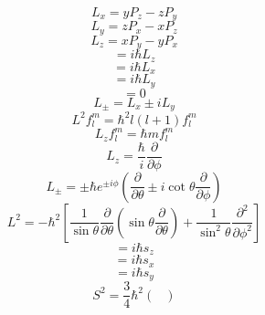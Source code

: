 \documentclass[10pt]{article}
\begin{document}
\begin{multicols}{3}
\begin{equation*}
L_{x}=yP_z-zP_y
\end{equation*}
\begin{equation*}
L_{y}=zP_x-xP_z
\end{equation*}
\begin{equation*}
L_{z}=xP_y-yP_x
\end{equation*}
\begin{equation*}
[L_x,L_y]=i\hbar L_z
\end{equation*}
\begin{equation*}
[L_y,L_z]=i\hbar L_x
\end{equation*}
\begin{equation*}
[L_z,L_x]=i\hbar L_y
\end{equation*}
\begin{equation*}
[L^2,L]=0
\end{equation*}
\begin{equation*}
L_{\pm}=L_x\pm iL_y
\end{equation*}
\begin{equation*}
L^{2}f_{l}^{m}=\hbar^2l(l+1)f_{l}^{m}
\end{equation*}
\begin{equation*}
L_zf_{l}^{m}=\hbar m f_{l}^{m}
\end{equation*}
\begin{equation*}
L_z=\frac{\hbar}{i}\frac{\partial}{\partial \phi}
\end{equation*}
\begin{equation*}
L_{\pm}=\pm\hbar e^{\pm i \phi}\left(\frac{\partial}{\partial \theta} \pm i\cot{\theta}\frac{\partial}{\partial \phi}\right)
\end{equation*}
\begin{equation*}
L^2=-\hbar^2\left[\frac{1}{\sin{\theta}}\frac{\partial}{\partial \theta}\left(\sin{\theta}\frac{\partial}{\partial \theta}\right)+\frac{1}{\sin^2{\theta}}\frac{\partial^2}{\partial \phi^2}\right]
\end{equation*}
\begin{equation*}
[s_x,s_y]=i\hbar s_z
\end{equation*}
\begin{equation*}
[s_y,s_z]=i\hbar s_x
\end{equation*}
\begin{equation*}
[s_z,s_x]=i\hbar s_y
\end{equation*}
\begin{equation*}
S^2=\frac{3}{4}\hbar^2
\begin{pmatrix}

\end{pmatrix}
\end{equation*}
\end{multicols}
\end{document}
